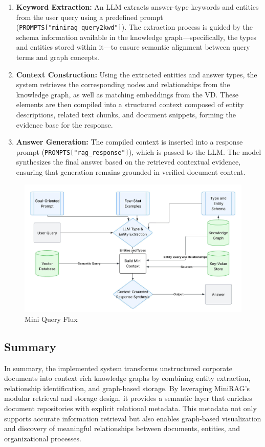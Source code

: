\begin{enumerate}
    \item \textbf{Keyword Extraction:}  
    An \gls{LLM} extracts answer-type keywords and entities from the user query using a predefined prompt (\texttt{PROMPTS["minirag\_query2kwd"]}).
    The extraction process is guided by the schema information available in the knowledge graph—specifically, the types and entities stored within it—to ensure semantic alignment between query terms and graph concepts.
    
    \item \textbf{Context Construction:}  
    Using the extracted entities and answer types, the system retrieves the corresponding nodes and relationships from the knowledge graph, as well as matching embeddings from the \gls{VD}.
    These elements are then compiled into a structured context composed of entity descriptions, related text chunks, and document snippets, forming the evidence base for the response.
    
    \item \textbf{Answer Generation:}  
    The compiled context is inserted into a response prompt (\texttt{PROMPTS["rag\_response"]}), which is passed to the \gls{LLM}.
    The model synthesizes the final answer based on the retrieved contextual evidence, ensuring that generation remains grounded in verified document content.
\end{enumerate}

\begin{figure}
    \centering
    \includegraphics[width=0.75\linewidth]{Images/Fluxograma_Mini_Query.jpeg}
    \caption{Mini Query Flux}
    \label{fig:mini-query-flux}
\end{figure}
\subsection{Summary}

In summary, the implemented system transforms unstructured corporate documents into context rich knowledge graphs by combining entity extraction, relationship identification, and graph-based storage.  
By leveraging MiniRAG’s modular retrieval and storage design, it provides a semantic layer that enriches document repositories with explicit relational metadata.  
This metadata not only supports accurate information retrieval but also enables graph-based visualization and discovery of meaningful relationships between documents, entities, and organizational processes.

